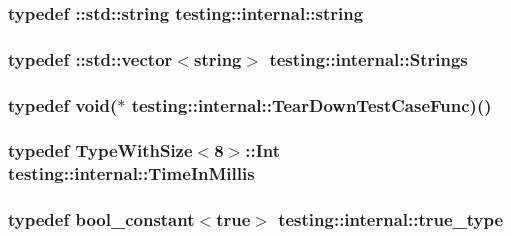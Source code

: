 \hypertarget{namespacetesting_1_1internal_a8e8ff5b11e64078831112677156cb111}{
\subsubsection[{string}]{\setlength{\rightskip}{0pt plus 5cm}typedef \-::std\-::string {\bf testing\-::internal\-::string}}}\label{namespacetesting_1_1internal_a8e8ff5b11e64078831112677156cb111}
\hypertarget{namespacetesting_1_1internal_a7706b17f05f4b49e351b052ae4e05073}{
\subsubsection[{Strings}]{\setlength{\rightskip}{0pt plus 5cm}typedef \-::std\-::vector$<${\bf string}$>$ {\bf testing\-::internal\-::\-Strings}}}\label{namespacetesting_1_1internal_a7706b17f05f4b49e351b052ae4e05073}
\hypertarget{namespacetesting_1_1internal_aad40244621b68546f3b830696225bf9b}{
\subsubsection[{Tear\-Down\-Test\-Case\-Func}]{\setlength{\rightskip}{0pt plus 5cm}typedef {\bf void}($\ast$ testing\-::internal\-::\-Tear\-Down\-Test\-Case\-Func)()}}\label{namespacetesting_1_1internal_aad40244621b68546f3b830696225bf9b}
\hypertarget{namespacetesting_1_1internal_a66a845df404b38fe85c5e14a069f255a}{
\subsubsection[{Time\-In\-Millis}]{\setlength{\rightskip}{0pt plus 5cm}typedef {\bf Type\-With\-Size}$<$8$>$\-::Int {\bf testing\-::internal\-::\-Time\-In\-Millis}}}\label{namespacetesting_1_1internal_a66a845df404b38fe85c5e14a069f255a}
\hypertarget{namespacetesting_1_1internal_a62f917c3424d8841de9b49b5ec28edb4}{
\subsubsection[{true\-\_\-type}]{\setlength{\rightskip}{0pt plus 5cm}typedef {\bf bool\-\_\-constant}$<$true$>$ {\bf testing\-::internal\-::true\-\_\-type}}}\label{namespacetesting_1_1internal_a62f917c3424d8841de9b49b5ec28edb4}
